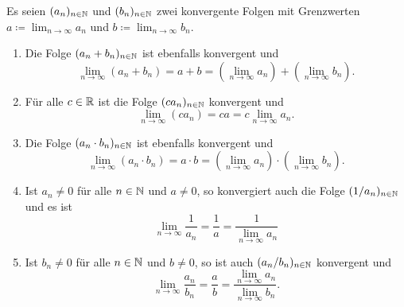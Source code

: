 \documentclass[a4paper,10pt]{article}
\begin{document}
\begin{prop}
 Es seien $(a_n)_{n \in \mathbb{N}}$ und $(b_n)_{n \in \mathbb{N}}$ zwei konvergente Folgen mit Grenzwerten $a \coloneqq \lim_{n \to \infty} a_n$ und $b \coloneqq \lim_{n \to \infty} b_n$.
 \begin{enumerate}
  \item
   Die Folge $(a_n + b_n)_{n \in \mathbb{N}}$ ist ebenfalls konvergent und
   \[
    \lim_{n \to \infty} (a_n + b_n)
    = a + b
    = \left(\lim_{n \to \infty} a_n\right) + \left(\lim_{n \to \infty} b_n\right).
   \]
  \item
   Für alle $c \in \mathbb{R}$ ist die Folge $(c a_n)_{n \in \mathbb{N}}$ konvergent und
   \[
    \lim_{n \to \infty} (c a_n)
    = c a
    = c \lim_{n \to \infty} a_n.
   \]
  \item
   Die Folge $(a_n \cdot b_n)_{n \in \mathbb{N}}$ ist ebenfalls konvergent und
   \[
    \lim_{n \to \infty} (a_n \cdot b_n)
    = a \cdot b
    = \left(\lim_{n \to \infty} a_n\right) \cdot \left(\lim_{n \to \infty} b_n\right).
   \]
  \item
   Ist $a_n \neq 0$ für alle $n \in \mathbb{N}$ und $a \neq 0$, so konvergiert auch die Folge $(1/a_n)_{n \in \mathbb{N}}$ und es ist
   \[
    \lim_{n \to \infty} \frac{1}{a_n}
    = \frac{1}{a}
    = \frac{1}{\lim_{n \to \infty} a_n}
   \]
  \item
   Ist $b_n \neq 0$ für alle $n \in \mathbb{N}$ und $b \neq 0$, so ist auch $(a_n/b_n)_{n \in \mathbb{N}}$ konvergent und
   \[
    \lim_{n \to \infty} \frac{a_n}{b_n}
    = \frac{a}{b}
    = \frac{\lim_{n \to \infty} a_n}{\lim_{n \to \infty} b_n}.
   \]
 \end{enumerate}
\end{prop}
\end{document}
